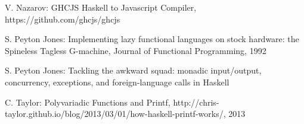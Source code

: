 \documentclass[preprint]{sigplanconf}
\begin{document}
\begin{thebibliography}{}
V. Nazarov: GHCJS Haskell to Javascript Compiler, https://github.com/ghcjs/ghcjs

S. Peyton Jones: Implementing lazy functional languages on stock hardware: the Spineless Tagless G-machine, Journal of Functional Programming, 1992

S. Peyton Jones: Tackling the awkward squad: monadic input/output, concurrency, exceptions, and foreign-language calls in Haskell

C. Taylor: Polyvariadic Functions and Printf, http://chris-taylor.github.io/blog/2013/03/01/how-haskell-printf-works/, 2013

\end{thebibliography}
\end{document}
